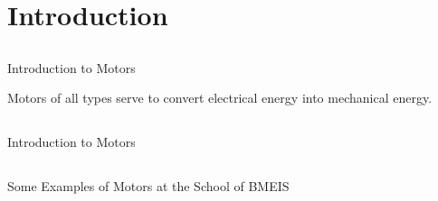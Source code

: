 \section{Introduction}


\subsection{}
{
\begin{frame}{Introduction to Motors}

\LARGE 
Motors of all types serve to convert electrical energy into mechanical energy. 

\end{frame}
}


\subsection{}
{
\begin{frame}{Introduction to Motors}

	\vspace{-3mm}
  	\begin{figure}
   	\end{figure}


\end{frame}
}




\subsection{}
{
\begin{frame}{Some Examples of Motors at the School of BMEIS}

	\vspace{-3mm}
   	\begin{figure}
 	\end{figure}

\end{frame}
}


